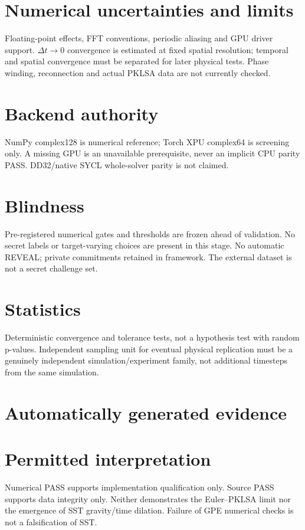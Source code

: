 \documentclass[11pt,a4paper]{article}
\begin{document}
\section{Numerical uncertainties and limits}
Floating-point effects, FFT conventions, periodic aliasing and GPU driver support. $\Delta t\to0$ convergence is estimated at fixed spatial resolution; temporal and spatial convergence must be separated for later physical tests. Phase winding, reconnection and actual PKLSA data are not currently checked.
\section{Backend authority}
NumPy complex128 is numerical reference; Torch XPU complex64 is screening only. A missing GPU is an unavailable prerequisite, never an implicit CPU parity PASS. DD32/native SYCL whole-solver parity is not claimed.
\section{Blindness}
Pre-registered numerical gates and thresholds are frozen ahead of validation. No secret labels or target-varying choices are present in this stage. No automatic REVEAL; private commitments retained in framework. The external dataset is not a secret challenge set.
\section{Statistics}
Deterministic convergence and tolerance tests, not a hypothesis test with random p-values. Independent sampling unit for eventual physical replication must be a genuinely independent simulation/experiment family, not additional timesteps from the same simulation.
\section{Automatically generated evidence}
\section{Permitted interpretation}
Numerical PASS supports implementation qualification only. Source PASS supports data integrity only. Neither demonstrates the Euler--PKLSA limit nor the emergence of SST gravity/time dilation. Failure of GPE numerical checks is not a falsification of SST.
\end{document}
